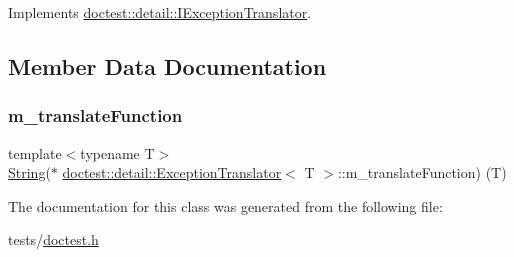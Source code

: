 Implements \hyperlink{structdoctest_1_1detail_1_1IExceptionTranslator_a9c56005e4c83c13b859cc2e31102bfbc}{doctest\+::detail\+::\+I\+Exception\+Translator}.



\subsection{Member Data Documentation}
\mbox{\label{classdoctest_1_1detail_1_1ExceptionTranslator_a739d70771e0f246622c81efde79fdf46}} 
\subsubsection{\texorpdfstring{m\+\_\+translate\+Function}{m\_translateFunction}}
{\footnotesize\ttfamily template$<$typename T$>$ \\
\hyperlink{classdoctest_1_1String}{String}($\ast$ \hyperlink{classdoctest_1_1detail_1_1ExceptionTranslator}{doctest\+::detail\+::\+Exception\+Translator}$<$ T $>$\+::m\+\_\+translate\+Function) (T)\hspace{0.3cm}{\ttfamily [private]}}



The documentation for this class was generated from the following file\+:\begin{DoxyCompactItemize}
\item 
tests/\hyperlink{doctest_8h}{doctest.\+h}\end{DoxyCompactItemize}
